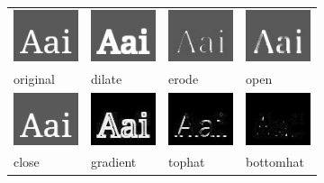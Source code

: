 \spc \begin{tabular}{llll}
\includegraphics[width=0.75in]{figures/morphsource.jpg} &
\includegraphics[width=0.75in]{figures/dilate.jpg} &
\includegraphics[width=0.75in]{figures/erode.jpg} &
\includegraphics[width=0.75in]{figures/morphopen.jpg} \\
original & dilate & erode & open \\
\includegraphics[width=0.75in]{figures/morphclose.jpg} &
\includegraphics[width=0.75in]{figures/morphgradient.jpg} &
\includegraphics[width=0.75in]{figures/tophat.jpg} &
\includegraphics[width=0.75in]{figures/bottomhat.jpg} \\
close & gradient & tophat & bottomhat \\
\end{tabular}

\apiend


 
\label{sec:iba:unsharpmask}


